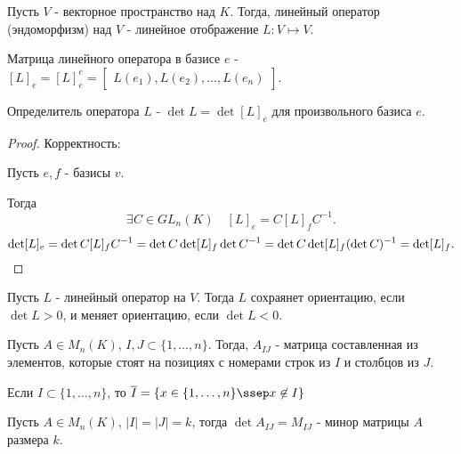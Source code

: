 \begin{definition} \thmslashn 

    Пусть $V$ - векторное пространство над $K$. Тогда, линейный оператор (эндоморфизм) над $V$ - линейное отображение $L : V \mapsto V$.
\end{definition}
\begin{definition} \thmslashn 

    Матрица линейного оператора в базисе $e$ - $[L]_{e} = [L]_{e}^{e} = \begin{bmatrix} L(e_1), L(e_2), \ldots, L(e_{n}) \end{bmatrix} $.
\end{definition}
\begin{definition} \thmslashn 

    Определитель оператора $L$ - $\det L = \det [L]_{e}$ для произвольного базиса $e$.
    \begin{proof} \thmslashn
    
        Корректность:

        Пусть $e, f$ - базисы $v$.

        Тогда
        \[ \exists{C\in GL_{n}(K)}\quad [L]_{e} = C[L]_{f}C^{-1}  .\]
        \[ \det [L]_{e} = \det C[L]_{f}C^{-1} = \det C \det [L]_{f} \det C^{-1} = \det C \det [L]_{f} (\det C)^{-1} = \det [L]_{f} .\qedhere\] 
    \end{proof}
\end{definition}
\begin{definition} \thmslashn 

    Пусть $L$ - линейный оператор на $V$. Тогда $L$ сохраянет ориентацию, если $\det L > 0$, и меняет ориентацию, если $\det L < 0$. 
\end{definition}
\begin{definition} \thmslashn 

    Пусть $A\in M_{n}(K)$, $I, J \subset \{1, \ldots, n\} $. Тогда, $A_{IJ}$ - матрица составленная из элементов, которые стоят на позициях с номерами строк из $I$ и столбцов из $J$.
\end{definition}
\begin{remark} \thmslashn

    Если $I \subset \{1, \ldots, n\} $, то $\overline{I} = \{x\in \{1, \ldots, n\}\ssep x \not\in I \} $
\end{remark}
\begin{definition} \thmslashn 

    Пусть $A\in M_{n}(K)$, $|I| = |J| = k$, тогда $\det A_{IJ} = M_{IJ}$ - минор матрицы $A$ размера $k$.
\end{definition}
